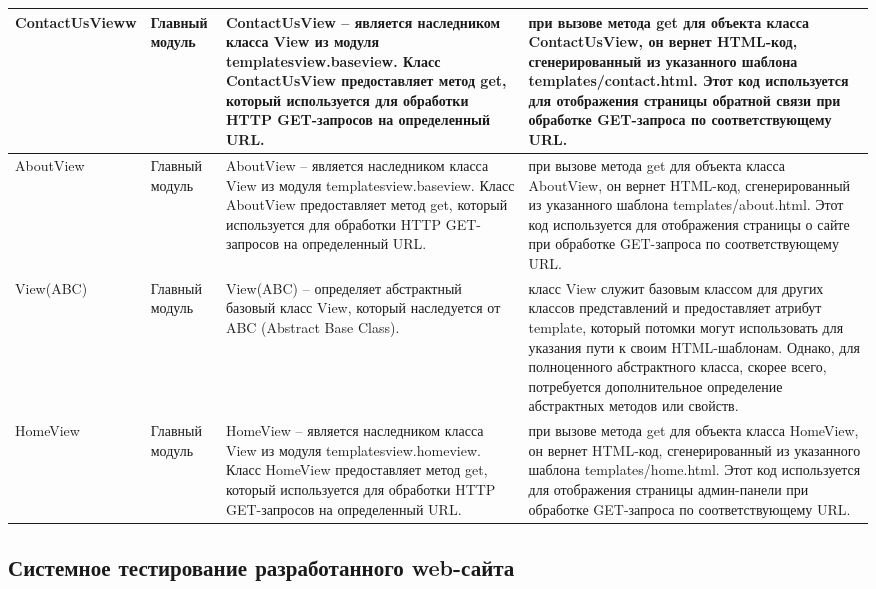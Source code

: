 \begin{xltabular}{\textwidth}{|X|p{2.5cm}|>{\setlength{\baselineskip}{0.7\baselineskip}}p{4.85cm}|>{\setlength{\baselineskip}{0.7\baselineskip}}p{4.85cm}|}
	\hline ContactUsVieww & Главный модуль & ContactUsView – является наследником класса View из модуля templatesview.baseview. Класс ContactUsView предоставляет метод get, который используется для обработки HTTP GET-запросов на определенный URL. & при вызове метода get для объекта класса ContactUsView, он вернет HTML-код, сгенерированный из указанного шаблона templates/contact.html. Этот код используется для отображения страницы обратной связи при обработке GET-запроса по соответствующему URL.\\
	
	\hline AboutView & Главный модуль & AboutView – является наследником класса View из модуля templatesview.baseview. Класс AboutView предоставляет метод get, который используется для обработки HTTP GET-запросов на определенный URL. & при вызове метода get для объекта класса AboutView, он вернет HTML-код, сгенерированный из указанного шаблона templates/about.html. Этот код используется для отображения страницы о сайте при обработке GET-запроса по соответствующему URL.\\
	
	\hline View(ABC) & Главный модуль & View(ABC) – определяет абстрактный базовый класс View, который наследуется от ABC (Abstract Base Class). & класс View служит базовым классом для других классов представлений и предоставляет атрибут template, который потомки могут использовать для указания пути к своим HTML-шаблонам. Однако, для полноценного абстрактного класса, скорее всего, потребуется дополнительное определение абстрактных методов или свойств.\\
	
	\hline HomeView & Главный модуль & HomeView – является наследником класса View из модуля templatesview.homeview. Класс HomeView предоставляет метод get, который используется для обработки HTTP GET-запросов на определенный URL. & при вызове метода get для объекта класса HomeView, он вернет HTML-код, сгенерированный из указанного шаблона templates/home.html. Этот код используется для отображения страницы админ-панели при обработке GET-запроса по соответствующему URL.\\
	
	
\end{xltabular}
\renewcommand{\arraystretch}{1.0} %


\subsection{Системное тестирование разработанного web-сайта}

